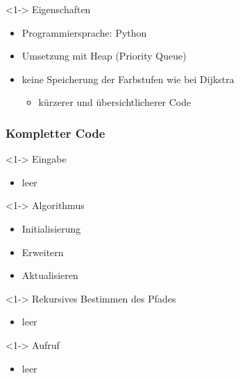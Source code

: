 \begin{frame}
	\begin{block} <1-> {Eigenschaften}
		\begin{itemize}
			\item <2-> Programmiersprache: Python
			\item <3-> Umsetzung mit Heap (Priority Queue)
			\item <4-> keine Speicherung der Farbstufen wie bei Dijkstra
				\begin{itemize}
					\item <5-> kürzerer und übersichtlicherer Code
				\end{itemize}
		\end{itemize}
	\end{block}	
\end{frame}


\begin{frame}
\frametitle{Kompletter Code}

\end{frame}


\begin{frame}
	\begin{block} <1-> {Eingabe}
		\begin{itemize}
			\item leer
		\end{itemize}
	\end{block}	
\end{frame}


\begin{frame}
	\begin{block} <1-> {Algorithmus}
		\begin{itemize}
		\item <1-> Initialisierung
		\item <2-> Erweitern
		\item <3-> Aktualisieren
		\end{itemize}
	\end{block}	
\end{frame}


\begin{frame}
	\begin{block} <1-> {Rekursives Bestimmen des Pfades}
		\begin{itemize}
			\item leer
		\end{itemize}
	\end{block}	
\end{frame}


\begin{frame}
	\begin{block} <1-> {Aufruf}
		\begin{itemize}
			\item leer
		\end{itemize}
	\end{block}	
\end{frame}


			

